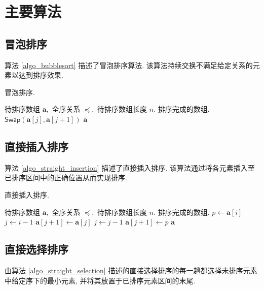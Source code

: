\documentclass[12pt]{article}
\begin{document}
\section{主要算法}

\subsection{冒泡排序}

算法 \ref{algo_bubblesort} 描述了冒泡排序算法. 该算法持续交换不满足给定关系的元素以达到排序效果.

\begin{algorithm}
\caption{冒泡排序.}
\label{algo_bubblesort}
\begin{algorithmic}[1]
\Require 待排序数组 $\bm{a},$ 全序关系 $\preceq,$ 待排序数组长度 $n.$
\Ensure 排序完成的数组.
            \State $\mathsf{Swap}(\bm{a}[j], \bm{a}[j + 1])$
        \EndIf
    \EndFor
\EndFor
\State \Return $\bm{a}$
\end{algorithmic}
\end{algorithm}

\subsection{直接插入排序}

算法 \ref{algo_straight_insertion} 描述了直接插入排序. 该算法通过将各元素插入至已排序区间中的正确位置从而实现排序.

\begin{algorithm}
\caption{直接插入排序.}
\label{algo_straight_insertion}
\begin{algorithmic}[1]
\Require 待排序数组 $\bm{a},$ 全序关系 $\preceq,$ 待排序数组长度 $n.$
\Ensure 排序完成的数组.
    \State $p \gets \bm{a}[i]$
    \State $j \gets i - 1$
        \State $\bm{a}[j + 1] \gets \bm{a}[j]$
        \State $j \gets j - 1$
    \EndWhile
    \State $\bm{a}[j + 1] \gets p$
\EndFor
\State \Return $\bm{a}$
\end{algorithmic}
\end{algorithm}

\subsection{直接选择排序}

由算法 \ref{algo_straight_selection} 描述的直接选择排序的每一趟都选择未排序元素中给定序下的最小元素, 并将其放置于已排序元素区间的末尾.
\end{document}
